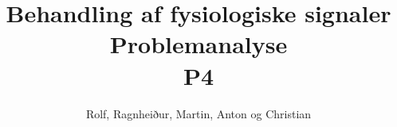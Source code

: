 \documentclass[12pt]{report}
\title{ Behandling af fysiologiske signaler\\ Problemanalyse\\ P4}
\author{Rolf, Ragnheiður, Martin, Anton og Christian}
\begin{document}
\maketitle

\tableofcontents
\newpage





	
	
	
	



\appendix

\listoftodos
\end{document}
